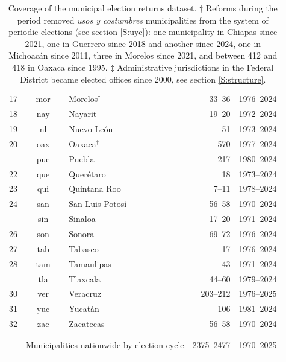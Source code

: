 \documentclass[letter,12pt]{article}
\newcommand{\mc}{\multicolumn}
\begin{document}
\begin{table}
{\begin{tabular}{rclrc}
      17 & mor & Morelos$^\dagger$                      &     33--36           & 1976--2024 \\
      18 & nay & Nayarit                               &     19--20           & 1972--2024 \\
      19 & nl  & Nuevo León                            &         51           & 1973--2024 \\
      20 & oax & Oaxaca$^\dagger$                       &        570           & 1977--2024 \\ \hdashline
      21 & pue & Puebla                                &        217           & 1980--2024 \\
      22 & que & Querétaro                             &         18           & 1973--2024 \\
      23 & qui & Quintana Roo                          &      7--11           & 1978--2024 \\
      24 & san & San Luis Potosí                       &     56--58           & 1970--2024 \\ \hdashline
      25 & sin & Sinaloa                               &     17--20           & 1971--2024 \\
      26 & son & Sonora                                &     69--72           & 1976--2024 \\
      27 & tab & Tabasco                               &         17           & 1976--2024 \\
      28 & tam & Tamaulipas                            &         43           & 1971--2024 \\ \hdashline
      29 & tla & Tlaxcala                              &     44--60           & 1979--2024 \\
      30 & ver & Veracruz                              &   203--212           & 1976--2025 \\
      31 & yuc & Yucatán                               &        106           & 1981--2024 \\
      32 & zac & Zacatecas                             &     56--58           & 1970--2024 \\
      \\ [-1.8ex] \hline
      \\ [-1.8ex] 
         & \mc{2}{l}{Municipalities nationwide by election cycle} & 2375--2477 & 1970--2025 \\
      \\ [-1.8ex] \hline

    \end{tabular}
}
\caption{Coverage of the municipal election returns dataset. $\dagger$  Reforms during the period removed \emph{usos y costumbres} municipalities from the system of periodic elections (see section \ref{S:uyc}): one municipality in Chiapas since 2021, one in Guerrero since 2018 and another since 2024, one in Michoacán since 2011, three in Morelos since 2021, and between 412 and 418 in Oaxaca since 1995. $\ddagger$ Administrative jurisdictions in the Federal District became elected offices since 2000, see section \ref{S:structure}.}\label{T:coverage}
\end{table}
\end{document}
